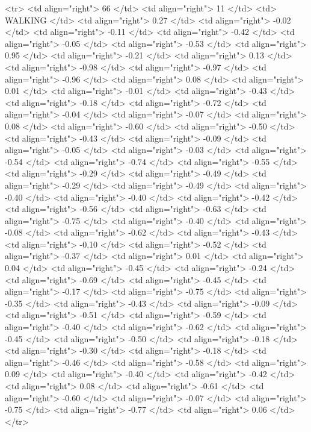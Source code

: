   <tr> <td align="right"> 66 </td> <td align="right">  11 </td> <td> WALKING </td> <td align="right"> 0.27 </td> <td align="right"> -0.02 </td> <td align="right"> -0.11 </td> <td align="right"> -0.42 </td> <td align="right"> -0.05 </td> <td align="right"> -0.53 </td> <td align="right"> 0.95 </td> <td align="right"> -0.21 </td> <td align="right"> 0.13 </td> <td align="right"> -0.98 </td> <td align="right"> -0.97 </td> <td align="right"> -0.96 </td> <td align="right"> 0.08 </td> <td align="right"> 0.01 </td> <td align="right"> -0.01 </td> <td align="right"> -0.43 </td> <td align="right"> -0.18 </td> <td align="right"> -0.72 </td> <td align="right"> -0.04 </td> <td align="right"> -0.07 </td> <td align="right"> 0.08 </td> <td align="right"> -0.60 </td> <td align="right"> -0.50 </td> <td align="right"> -0.43 </td> <td align="right"> -0.09 </td> <td align="right"> -0.05 </td> <td align="right"> -0.03 </td> <td align="right"> -0.54 </td> <td align="right"> -0.74 </td> <td align="right"> -0.55 </td> <td align="right"> -0.29 </td> <td align="right"> -0.49 </td> <td align="right"> -0.29 </td> <td align="right"> -0.49 </td> <td align="right"> -0.40 </td> <td align="right"> -0.40 </td> <td align="right"> -0.42 </td> <td align="right"> -0.56 </td> <td align="right"> -0.63 </td> <td align="right"> -0.75 </td> <td align="right"> -0.40 </td> <td align="right"> -0.08 </td> <td align="right"> -0.62 </td> <td align="right"> -0.43 </td> <td align="right"> -0.10 </td> <td align="right"> -0.52 </td> <td align="right"> -0.37 </td> <td align="right"> 0.01 </td> <td align="right"> 0.04 </td> <td align="right"> -0.45 </td> <td align="right"> -0.24 </td> <td align="right"> -0.69 </td> <td align="right"> -0.45 </td> <td align="right"> -0.17 </td> <td align="right"> -0.75 </td> <td align="right"> -0.35 </td> <td align="right"> -0.43 </td> <td align="right"> -0.09 </td> <td align="right"> -0.51 </td> <td align="right"> -0.59 </td> <td align="right"> -0.40 </td> <td align="right"> -0.62 </td> <td align="right"> -0.45 </td> <td align="right"> -0.50 </td> <td align="right"> -0.18 </td> <td align="right"> -0.30 </td> <td align="right"> -0.18 </td> <td align="right"> -0.46 </td> <td align="right"> -0.58 </td> <td align="right"> 0.09 </td> <td align="right"> -0.40 </td> <td align="right"> -0.42 </td> <td align="right"> 0.08 </td> <td align="right"> -0.61 </td> <td align="right"> -0.60 </td> <td align="right"> -0.07 </td> <td align="right"> -0.75 </td> <td align="right"> -0.77 </td> <td align="right"> 0.06 </td> </tr>

